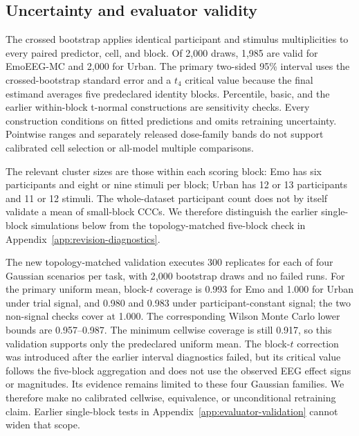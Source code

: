 \subsection{Uncertainty and evaluator validity}
The crossed bootstrap applies identical participant and stimulus
multiplicities to every paired predictor, cell, and block. Of 2,000 draws, 1,985
are valid for EmoEEG-MC and 2,000 for Urban. The primary two-sided 95\% interval uses the
crossed-bootstrap standard error and a $t_{4}$ critical value because the final
estimand averages five predeclared identity blocks. Percentile, basic, and the
earlier within-block t-normal constructions are sensitivity checks. Every
construction conditions on fitted predictions and omits retraining uncertainty.
Pointwise ranges and separately released dose-family bands do not support
calibrated cell selection or all-model multiple comparisons.

The relevant cluster sizes are those within each scoring block: Emo has six
participants and eight or nine stimuli per block; Urban has 12 or 13
participants and 11 or 12 stimuli. The whole-dataset participant count does
not by itself validate a mean of small-block CCCs. We therefore distinguish
the earlier single-block simulations below from the topology-matched
five-block check in Appendix~\ref{app:revision-diagnostics}.

The new topology-matched validation executes 300 replicates for each of four
Gaussian scenarios per task, with 2,000 bootstrap draws and no failed runs.
For the primary uniform mean, block-$t$ coverage is 0.993 for Emo and 1.000
for Urban under trial signal, and 0.980 and 0.983 under participant-constant
signal; the two non-signal checks cover at 1.000. The corresponding Wilson
Monte Carlo lower bounds are 0.957--0.987. The minimum cellwise coverage is
still 0.917, so this validation supports only the predeclared uniform mean.
The block-$t$ correction was introduced after the earlier interval diagnostics
failed, but its critical value follows the five-block aggregation and does not
use the observed EEG effect signs or magnitudes. Its evidence remains limited
to these four Gaussian families. We therefore make no calibrated cellwise,
equivalence, or unconditional retraining claim. Earlier single-block tests in
Appendix~\ref{app:evaluator-validation} cannot widen that scope.

